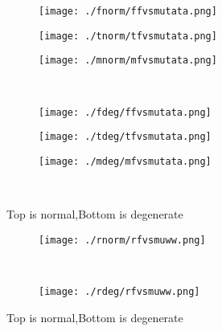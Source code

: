 \documentclass[aps,floats,floatfix,nofootinbib]{revtex4-1}
\begin{document}
\begin{center}
\begin{figure}
\begin{subfigure}{0.3\textwidth}
\texttt{[image: ./fnorm/ffvsmutata.png]}
\label{}
\end{subfigure}
\begin{subfigure}{0.3\textwidth}
\texttt{[image: ./tnorm/tfvsmutata.png]}
\label{}
\end{subfigure}
\begin{subfigure}{0.3\textwidth}
\texttt{[image: ./mnorm/mfvsmutata.png]}
\label{}
\end{subfigure}\\
\begin{subfigure}{0.3\textwidth}
\texttt{[image: ./fdeg/ffvsmutata.png]}
\label{}
\end{subfigure}
\begin{subfigure}{0.3\textwidth}
\texttt{[image: ./tdeg/tfvsmutata.png]}
\label{}
\end{subfigure}
\begin{subfigure}{0.3\textwidth}
\texttt{[image: ./mdeg/mfvsmutata.png]}
\label{}
\end{subfigure}\\
\caption{Top is normal,Bottom is degenerate}
\end{figure}
\end{center}

\begin{center}
\begin{figure}
\begin{subfigure}{0.95\textwidth}
\texttt{[image: ./rnorm/rfvsmuww.png]}
\label{}
\end{subfigure}\\
\begin{subfigure}{0.95\textwidth}
\texttt{[image: ./rdeg/rfvsmuww.png]}
\label{}
\end{subfigure}
\caption{Top is normal,Bottom is degenerate}
\end{figure}
\end{center}
\end{document}
